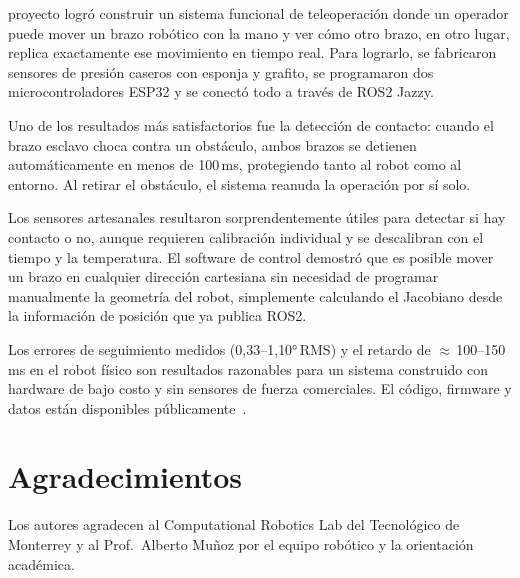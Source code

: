 \documentclass[journal,10pt,twoside]{IEEEtran}
\newcommand{\ros}{ROS2}
\begin{document}
 proyecto logró construir un sistema funcional
de teleoperación donde un operador puede mover un brazo robótico
con la mano y ver cómo otro brazo, en otro lugar, replica exactamente
ese movimiento en tiempo real. Para lograrlo, se fabricaron sensores
de presión caseros con esponja y grafito, se programaron dos
microcontroladores ESP32 y se conectó todo a través de \ros{} Jazzy.
 
Uno de los resultados más satisfactorios fue la detección de
contacto: cuando el brazo esclavo choca contra un obstáculo, ambos
brazos se detienen automáticamente en menos de 100\,ms, protegiendo
tanto al robot como al entorno. Al retirar el obstáculo, el sistema
reanuda la operación por sí solo.
 
Los sensores artesanales resultaron sorprendentemente útiles para
detectar si hay contacto o no, aunque requieren calibración
individual y se descalibran con el tiempo y la temperatura. El
software de control demostró que es posible mover un brazo en
cualquier dirección cartesiana sin necesidad de programar
manualmente la geometría del robot, simplemente calculando el
Jacobiano desde la información de posición que ya publica \ros{}.
 
Los errores de seguimiento medidos (0{,}33--1{,}10°\,RMS) y el
retardo de $\approx$\,100--150\,ms en el robot físico son resultados
razonables para un sistema construido con hardware de bajo costo y
sin sensores de fuerza comerciales.
El código, firmware y datos están disponibles
públicamente~\cite{repo}.

\section*{Agradecimientos}
Los autores agradecen al Computational Robotics Lab del Tecnológico
de Monterrey y al Prof.\ Alberto Muñoz por el equipo robótico y
la orientación académica.
\end{document}
